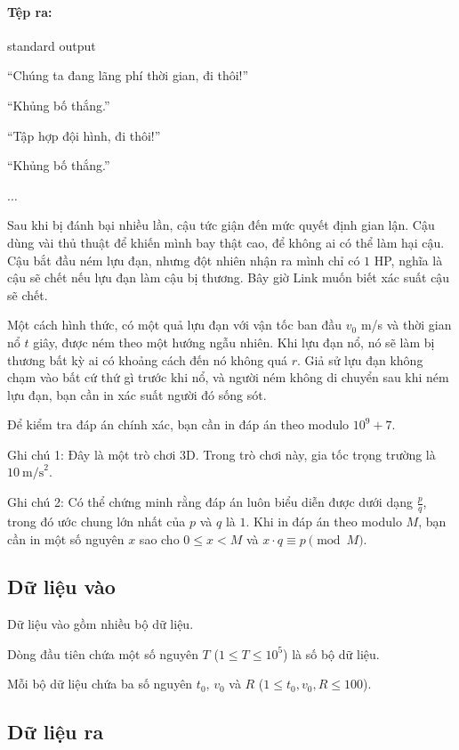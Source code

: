 \documentclass[11pt]{article}
\begin{document}
\paragraph{Tệp ra:} standard output

``Chúng ta đang lãng phí thời gian, đi thôi!''

``Khủng bố thắng.''

``Tập hợp đội hình, đi thôi!''

``Khủng bố thắng.''

\(\ldots\)

Sau khi bị đánh bại nhiều lần, cậu tức giận đến mức quyết định gian lận. Cậu
dùng vài thủ thuật để khiến mình bay thật cao, để không ai có thể làm hại cậu.
Cậu bắt đầu ném lựu đạn, nhưng đột nhiên nhận ra mình chỉ có \(1\) HP, nghĩa
là cậu sẽ chết nếu lựu đạn làm cậu bị thương. Bây giờ Link muốn biết xác suất
cậu sẽ chết.

Một cách hình thức, có một quả lựu đạn với vận tốc ban đầu \(v_0\) m/s và
thời gian nổ \(t\) giây, được ném theo một hướng ngẫu nhiên. Khi lựu đạn nổ,
nó sẽ làm bị thương bất kỳ ai có khoảng cách đến nó không quá \(r\). Giả sử
lựu đạn không chạm vào bất cứ thứ gì trước khi nổ, và người ném không di
chuyển sau khi ném lựu đạn, bạn cần in xác suất người đó sống sót.

Để kiểm tra đáp án chính xác, bạn cần in đáp án theo modulo \(10^9+7\).

Ghi chú 1: Đây là một trò chơi 3D. Trong trò chơi này, gia tốc trọng trường là
\(10\ \text{m/s}^2\).

Ghi chú 2: Có thể chứng minh rằng đáp án luôn biểu diễn được dưới dạng
\(\frac{p}{q}\), trong đó ước chung lớn nhất của \(p\) và \(q\) là \(1\). Khi
in đáp án theo modulo \(M\), bạn cần in một số nguyên \(x\) sao cho
\(0\le x<M\) và \(x\cdot q\equiv p\pmod M\).

\subsection*{Dữ liệu vào}

Dữ liệu vào gồm nhiều bộ dữ liệu.

Dòng đầu tiên chứa một số nguyên \(T\) (\(1\le T\le 10^5\)) là số bộ dữ liệu.

Mỗi bộ dữ liệu chứa ba số nguyên \(t_0\), \(v_0\) và \(R\)
(\(1\le t_0,v_0,R\le 100\)).

\subsection*{Dữ liệu ra}
\end{document}

